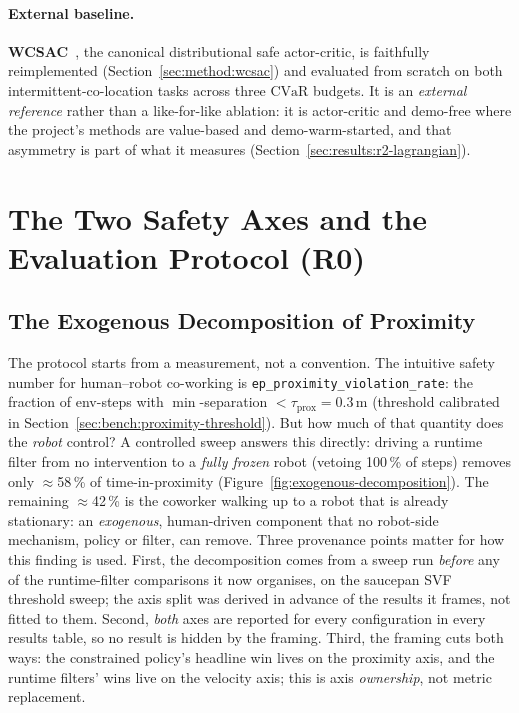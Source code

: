 \documentclass[11pt,a4paper]{report}
\newcommand{\cvar}{\ensuremath{\mathrm{CVaR}}}
\begin{document}
\paragraph{External baseline.}
\textbf{WCSAC}~\cite{yang2021wcsac}, the canonical distributional
safe actor-critic, is faithfully reimplemented
(Section~\ref{sec:method:wcsac}) and evaluated from scratch on both
intermittent-co-location tasks across three \cvar{} budgets. It is an
\emph{external reference} rather than a like-for-like ablation: it is
actor-critic and demo-free where the project's methods are
value-based and demo-warm-started, and that asymmetry is part of what
it measures (Section~\ref{sec:results:r2-lagrangian}).

\section{The Two Safety Axes and the Evaluation Protocol (R0)}
\label{sec:setup:metrics}

\subsection{The Exogenous Decomposition of Proximity}
\label{sec:setup:metrics:primary}
\label{sec:exogenous}

The protocol starts from a measurement, not a convention. The
intuitive safety number for human--robot co-working is
\texttt{ep\_proximity\_violation\_rate}: the fraction of env-steps
with $\min$-separation $< \tau_{\mathrm{prox}} = 0.3$\,m (threshold
calibrated in Section~\ref{sec:bench:proximity-threshold}). But how
much of that quantity does the \emph{robot} control? A controlled
sweep answers this directly: driving a runtime filter from no
intervention to a \emph{fully frozen} robot (vetoing 100\,\% of
steps) removes only $\approx$58\,\% of time-in-proximity
(Figure~\ref{fig:exogenous-decomposition}). The remaining
$\approx$42\,\% is the coworker walking up to a robot that is already
stationary: an \emph{exogenous}, human-driven component that no
robot-side mechanism, policy or filter, can remove. Three provenance
points matter for how this finding is used. First, the decomposition
comes from a sweep run \emph{before} any of the runtime-filter
comparisons it now organises, on the saucepan SVF threshold sweep; the
axis split was derived in advance of the results it frames, not
fitted to them. Second, \emph{both} axes are reported for every
configuration in every results table, so no result is hidden by the
framing. Third, the framing cuts both ways: the constrained policy's
headline win lives on the proximity axis, and the runtime filters'
wins live on the velocity axis; this is axis \emph{ownership}, not
metric replacement.
\end{document}

